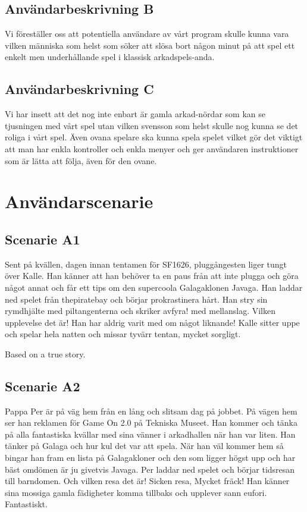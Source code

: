 \documentclass[a4paper,11pt]{article}
\begin{document}
\subsection{Användarbeskrivning B}
Vi föreställer oss att potentiella användare av vårt program skulle kunna vara vilken människa som helst som söker att slösa bort någon minut på att spel ett enkelt men underhållande spel i klassisk arkadspels-anda.

\subsection{Användarbeskrivning C}
Vi har insett att det nog inte enbart är gamla arkad-nördar som kan se tjusningen med vårt spel utan vilken svensson som helst skulle nog kunna se det roliga i vårt spel. Även ovana spelare ska kunna spela spelet vilket gör det viktigt att man har enkla kontroller och enkla menyer och ger användaren instruktioner som är lätta att följa, även för den ovane.


\section{Användarscenarie}
\subsection{Scenarie A1}
Sent på kvällen, dagen innan tentamen för SF1626, pluggångesten liger tungt över Kalle. Han känner att han behöver ta en paus från att inte plugga och göra något annat och får ett tips om den supercoola Galagaklonen Javaga. Han laddar ned spelet från thepiratebay och börjar prokrastinera hårt. Han stry sin rymdhjälte med piltangenterna och skriker avfyra! med mellanslag. Vilken upplevelse det är! Han har aldrig varit med om något liknande! Kalle sitter uppe och spelar hela natten och missar tyvärr tentan, mycket sorgligt. 

\noindent
Based on a true story.

\subsection{Scenarie A2}
Pappa Per är på väg hem från en lång och slitsam dag på jobbet. På vägen hem ser han reklamen för Game On 2.0 på Tekniska Museet. Han kommer och tänka på alla fantastiska kvällar med sina vänner i arkadhallen när han var liten. Han tänker på Galaga och hur kul det var att spela. När han väl kommer hem så bingar han fram en lista på Galagakloner och den som ligger högst upp och har bäst omdömen är ju givetvis Javaga. Per laddar ned spelet och börjar tidsresan till barndomen. Och vilken resa det är! Sicken resa, Mycket fräck! Han känner sina mossiga gamla fädigheter komma tillbaks och upplever sann eufori. Fantastiskt.
\end{document}

